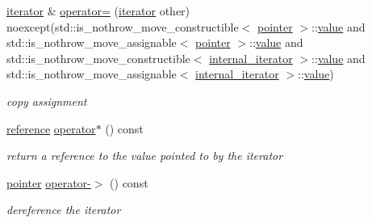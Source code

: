 \begin{DoxyCompactItemize}
\hyperlink{classnlohmann_1_1basic__json_1_1iterator}{iterator} \& \hyperlink{classnlohmann_1_1basic__json_1_1iterator_a51b0ed345317cfd1b2386f481d774477}{operator=} (\hyperlink{classnlohmann_1_1basic__json_1_1iterator}{iterator} other) noexcept(std\+::is\+\_\+nothrow\+\_\+move\+\_\+constructible$<$ \hyperlink{classnlohmann_1_1basic__json_1_1const__iterator_a1da96fc3054d547e7706d3a2f073f389}{pointer} $>$\+::\hyperlink{classnlohmann_1_1basic__json_1_1iterator_ac688806417f3b4e17c4eb1b661b522f1}{value} and std\+::is\+\_\+nothrow\+\_\+move\+\_\+assignable$<$ \hyperlink{classnlohmann_1_1basic__json_1_1const__iterator_a1da96fc3054d547e7706d3a2f073f389}{pointer} $>$\+::\hyperlink{classnlohmann_1_1basic__json_1_1iterator_ac688806417f3b4e17c4eb1b661b522f1}{value} and std\+::is\+\_\+nothrow\+\_\+move\+\_\+constructible$<$ \hyperlink{structnlohmann_1_1basic__json_1_1internal__iterator}{internal\+\_\+iterator} $>$\+::\hyperlink{classnlohmann_1_1basic__json_1_1iterator_ac688806417f3b4e17c4eb1b661b522f1}{value} and std\+::is\+\_\+nothrow\+\_\+move\+\_\+assignable$<$ \hyperlink{structnlohmann_1_1basic__json_1_1internal__iterator}{internal\+\_\+iterator} $>$\+::\hyperlink{classnlohmann_1_1basic__json_1_1iterator_ac688806417f3b4e17c4eb1b661b522f1}{value})
\begin{DoxyCompactList}\small\item\em copy assignment \end{DoxyCompactList}\item 
\hypertarget{classnlohmann_1_1basic__json_1_1iterator_a1af28ba60302eb48edf4fdbc88e75903}{}\label{classnlohmann_1_1basic__json_1_1iterator_a1af28ba60302eb48edf4fdbc88e75903} 
\hyperlink{classnlohmann_1_1basic__json_1_1const__iterator_aefd248cac6493eed1e6ff53ba6a63eb2}{reference} \hyperlink{classnlohmann_1_1basic__json_1_1iterator_a1af28ba60302eb48edf4fdbc88e75903}{operator$\ast$} () const
\begin{DoxyCompactList}\small\item\em return a reference to the value pointed to by the iterator \end{DoxyCompactList}\item 
\hypertarget{classnlohmann_1_1basic__json_1_1iterator_a12c7f8236ffa08a5dd27cbd9888b74be}{}\label{classnlohmann_1_1basic__json_1_1iterator_a12c7f8236ffa08a5dd27cbd9888b74be} 
\hyperlink{classnlohmann_1_1basic__json_1_1const__iterator_a1da96fc3054d547e7706d3a2f073f389}{pointer} \hyperlink{classnlohmann_1_1basic__json_1_1iterator_a12c7f8236ffa08a5dd27cbd9888b74be}{operator-\/$>$} () const
\begin{DoxyCompactList}\small\item\em dereference the iterator \end{DoxyCompactList}\item 

\end{DoxyCompactItemize}

